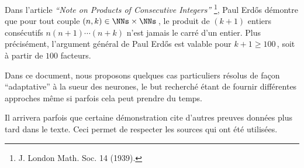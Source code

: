 Dans l'article \emph{\enquote{Note on Products of Consecutive Integers}}
\footnote{
	J. London Math. Soc. 14 (1939).
},
Paul Erdős démontre que pour tout couple $(n, k) \in \NNs \times \NNs$\,, le produit de $(k+1)$ entiers consécutifs $n (n + 1) \cdots (n + k)$ n'est jamais le carré d'un entier. 
Plus précisément, l'argument général de Paul Erdős est valable pour $k + 1 \geq 100$\,, soit à partir de $100$ facteurs.

\medskip

Dans ce document, nous proposons quelques cas particuliers résolus de façon \enquote{adaptative} à la sueur des neurones, le but recherché étant de fournir différentes approches même si parfois cela peut prendre du temps.


\begin{remark}
	Il arrivera parfois que certaine démonstration cite d'autres preuves données plus tard dans le texte. Ceci permet de respecter les sources qui ont été utilisées.
\end{remark}
